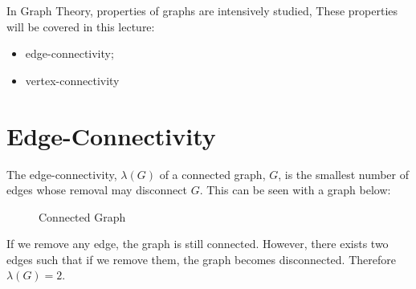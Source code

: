 
In Graph Theory, properties of graphs are intensively studied, These properties will be covered in this lecture:
\begin{itemize}
    \item edge-connectivity;
    \item vertex-connectivity
\end{itemize}

\section{Edge-Connectivity}

The edge-connectivity, $\lambda (G)$ of a connected graph, $G$, is the smallest number of edges whose removal may disconnect $G$. This can be seen with a graph below:

\begin{minipage}{0.45\textwidth}
    \begin{figure}[H]
        \centering
        \caption{Connected Graph}
    \end{figure}
\end{minipage} \hfill
\begin{minipage}{0.45\textwidth}
    If we remove any edge, the graph is still connected. However, there exists two edges such that if we remove them, the graph becomes disconnected. Therefore $\lambda(G)=2$. 
\end{minipage}\vspace{0.5em}

